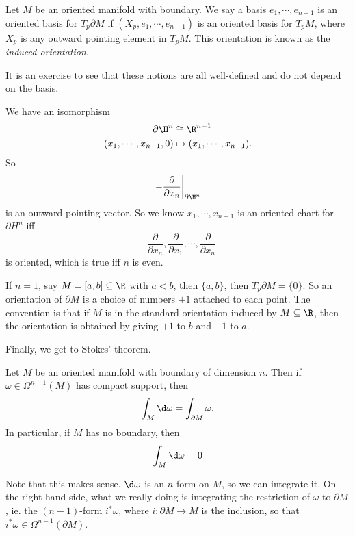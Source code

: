 \documentclass[a4paper]{article}
\begin{document}
\begin{defi}
  Let $M$ be an oriented manifold with boundary. We say a basis $e_1,\cdots, e_{n - 1}$ is an oriented basis for $T_p \partial M$ if $(X_p, e_1, \cdots, e_{n - 1})$ is an oriented basis for $T_p M$, where $X_p$ is any outward pointing element in $T_p M$. This orientation is known as the \emph{induced orientation}.
\end{defi}

It is an exercise to see that these notions are all well-defined and do not depend on the basis.
\begin{eg}
  We have an isomorphism
  \begin{align*}
    \partial\H^n &\cong \R^{n - 1}\\
    (x_1, \cdots, x_{n - 1}, 0) &\mapsto (x_1, \cdots, x_{n - 1}).
  \end{align*}
  So
  \[
    \left.-\frac{\partial}{\partial x_n}\right|_{\partial \H^n}
  \]
  is an outward pointing vector. So we know $x_1, \cdots, x_{n - 1}$ is an oriented chart for $\partial H^n$ iff
  \[
    -\frac{\partial}{\partial x_n}, \frac{\partial}{\partial x_1}, \cdots, \frac{\partial}{\partial x_n}
  \]
  is oriented, which is true iff $n$ is even.
\end{eg}

\begin{eg}
  If $n = 1$, say $M = [a, b] \subseteq \R$ with $a < b$, then $\{a, b\}$, then $T_p \partial M = \{0\}$. So an orientation of $\partial M$ is a choice of numbers $\pm 1$ attached to each point. The convention is that if $M$ is in the standard orientation induced by $M \subseteq \R$, then the orientation is obtained by giving $+1$ to $b$ and $-1$ to $a$.
\end{eg}

Finally, we get to Stokes' theorem.
\begin{thm}
  Let $M$ be an oriented manifold with boundary of dimension $n$. Then if $\omega \in \Omega^{n - 1}(M)$ has compact support, then
  \[
    \int_M \d \omega = \int_{\partial M}\omega.
  \]
  In particular, if $M$ has no boundary, then
  \[
    \int_M \d \omega = 0
  \]
\end{thm}
Note that this makes sense. $\d \omega$ is an $n$-form on $M$, so we can integrate it. On the right hand side, what we really doing is integrating the restriction of $\omega$ to $\partial M$, ie. the $(n - 1)$-form $i^* \omega$, where $i: \partial M \to M$ is the inclusion, so that $i^* \omega \in \Omega^{n - 1}(\partial M)$.
\end{document}
